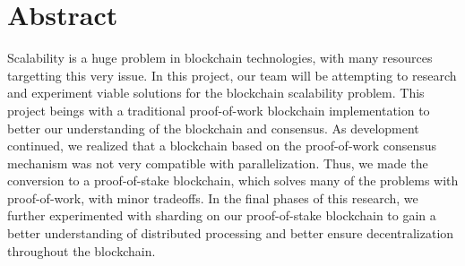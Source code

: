 \chapter*{Abstract}

Scalability is a huge problem in blockchain technologies, with many resources targetting this very issue. In this project, our team will be attempting to research and experiment viable solutions for the blockchain scalability problem. This project beings with a traditional proof-of-work blockchain implementation to better our understanding of the blockchain and consensus. As development continued, we realized that a blockchain based on the proof-of-work consensus mechanism was not very compatible with parallelization. Thus, we made the conversion to a proof-of-stake blockchain, which solves many of the problems with proof-of-work, with minor tradeoffs. In the final phases of this research, we further experimented with sharding on our proof-of-stake blockchain to gain a better understanding of distributed processing and better ensure decentralization throughout the blockchain.
